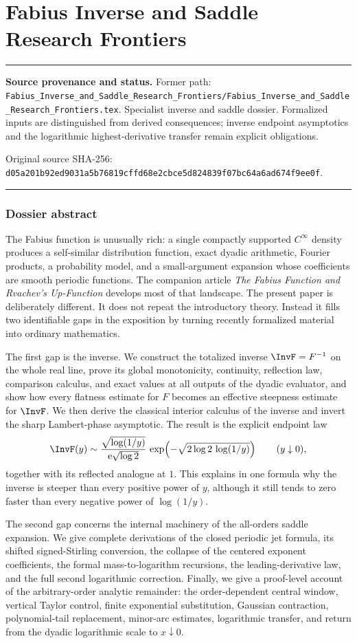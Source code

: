 \documentclass[11pt,oneside]{article}
\theoremstyle{definition}
\theoremstyle{remark}
\newcommand{\e}{\mathrm e}
\newenvironment{boxedremark}{%
  \par\smallskip\noindent\begin{center}\begin{minipage}{0.94\textwidth}%
  \color{black}\hrule\vspace{0.6em}\small
}{%
  \vspace{0.6em}\hrule\end{minipage}\end{center}\smallskip
}
\begin{document}
\part{Fabius Inverse and Saddle Research Frontiers}
\label{part:inverse}
\begin{boxedremark}
\textbf{Source provenance and status.} Former path: \nolinkurl{Fabius_Inverse_and_Saddle_Research_Frontiers/Fabius_Inverse_and_Saddle_Research_Frontiers.tex}.  Specialist inverse and saddle dossier.  Formalized inputs are distinguished from derived consequences; inverse endpoint asymptotics and the logarithmic highest-derivative transfer remain explicit obligations.\par\smallskip Original source SHA-256: \nolinkurl{d05a201b92ed9031a5b76819cffd68e2cbce5d824839f07bc64a6ad674f9ee0f}.
\end{boxedremark}
\section*{Dossier abstract}
The Fabius function is unusually rich: a single compactly supported
$C^\infty$ density produces a self-similar distribution function, exact
dyadic arithmetic, Fourier products, a probability model, and a
small-argument expansion whose coefficients are smooth periodic functions.
The companion article \emph{The Fabius Function and Rvachev's Up-Function}
develops most of that landscape.  The present paper is deliberately
different.  It does not repeat the introductory theory.  Instead it fills
two identifiable gaps in the exposition by turning recently formalized
material into ordinary mathematics.

The first gap is the inverse.  We construct the totalized inverse
$\InvF=F^{-1}$ on the whole real line, prove its global monotonicity,
continuity, reflection law, comparison calculus, and exact values at all
outputs of the dyadic evaluator, and show how every flatness estimate for
$F$ becomes an effective steepness estimate for $\InvF$.  We then derive
the classical interior calculus of the inverse and invert the sharp
Lambert-phase asymptotic.  The result is the explicit endpoint law
\[
 \InvF(y)\sim
 \frac{\sqrt{\log(1/y)}}{\e\sqrt{\log 2}}\,
 \exp\!\left(-\sqrt{2\log 2\,\log(1/y)}\right)
 \qquad (y\downarrow0),
\]
together with its reflected analogue at $1$.  This explains in one formula
why the inverse is steeper than every positive power of $y$, although it
still tends to zero faster than every negative power of $\log(1/y)$.

The second gap concerns the internal machinery of the all-orders saddle
expansion.  We give complete derivations of the closed periodic jet
formula, its shifted signed-Stirling conversion, the collapse of the
centered exponent coefficients, the formal mass-to-logarithm recursions,
the leading-derivative law, and the full second logarithmic correction.
Finally, we give a proof-level account of the arbitrary-order analytic
remainder: the order-dependent central window, vertical Taylor control,
finite exponential substitution, Gaussian contraction, polynomial-tail
replacement, minor-arc estimates, logarithmic transfer, and return from
the dyadic logarithmic scale to $x\downarrow0$.
\end{document}
